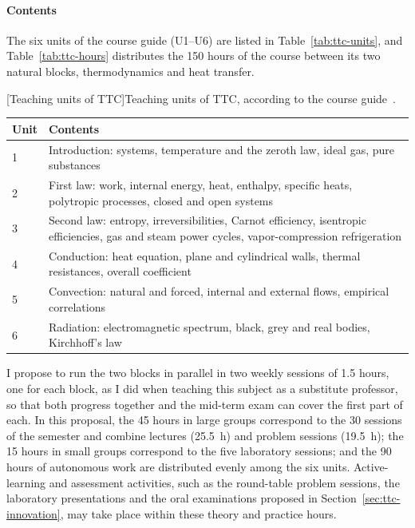 \documentclass[11pt]{article}
\newcommand{\NEW}[1]{\iffinal #1\else{\color{red}#1}\fi}
\begin{document}
\paragraph{Contents}
The six units of the course guide \NEW{(U1--U6)} are listed in Table~\ref{tab:ttc-units}, and Table~\ref{tab:ttc-hours} distributes the 150 hours of the course between its two natural blocks, thermodynamics and heat transfer.
\begin{center}\small
{}[Teaching units of TTC]{Teaching units of TTC, according to the course guide~\cite{UPCGuides}.}\label{tab:ttc-units}
\begin{tabularx}{\textwidth}{@{}p{0.6cm}X@{}}
\toprule
\textbf{Unit} & \textbf{Contents} \\
\midrule
1 & Introduction: systems, temperature and the zeroth law, ideal gas, pure substances \\
2 & First law: work, internal energy, heat, enthalpy, specific heats, polytropic processes, closed and open systems \\
3 & Second law: entropy, irreversibilities, Carnot efficiency, isentropic efficiencies, gas and steam power cycles, vapor-compression refrigeration \\
4 & Conduction: heat equation, plane and cylindrical walls, thermal resistances, overall coefficient \\
5 & Convection: natural and forced, internal and external flows, empirical correlations \\
6 & Radiation: electromagnetic spectrum, black, grey and real bodies, Kirchhoff's law \\
\bottomrule
\end{tabularx}
\end{center}

I propose to run the two blocks in parallel in two weekly sessions of 1.5 hours, one for each block, as I did when teaching this subject as a substitute professor, so that both progress together and the mid-term exam can cover the first part of each. 
In this proposal, the 45 hours in large groups correspond to the 30 sessions of the semester and combine lectures (25.5~h) and problem sessions (19.5~h); the 15 hours in small groups correspond to the five laboratory sessions; and the 90 hours of autonomous work are distributed evenly among the six units. 
Active-learning and assessment activities, such as the round-table problem sessions, the laboratory presentations and the oral examinations proposed in Section~\ref{sec:ttc-innovation}, may take place within these theory and practice hours.
\end{document}
